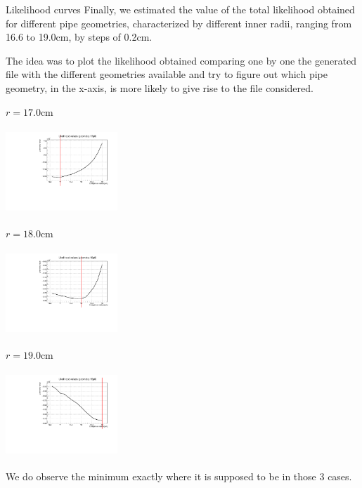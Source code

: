 \documentclass[8 pt]{beamer}
\begin{document}
\begin{frame}{Likelihood curves}
\justifying
Finally, we estimated the value of the total likelihood obtained for different pipe geometries, characterized by different inner radii, ranging from 16.6 to 19.0cm, by steps of 0.2cm. \vfill

The idea was to plot the likelihood obtained comparing one by one the generated file with the different geometries available and try to figure out which pipe geometry, in the x-axis, is more likely to give rise to the file considered. \vfill

\begin{minipage}[c]{.32\textwidth}
\begin{exampleblock}{} \begin{center}$r = 17.0$cm\end{center} \end{exampleblock}
\includegraphics[width=4.2cm, height=3.2cm]{figs/likelihood100HighStat/likelihood17p0.pdf} 
\end{minipage}
\begin{minipage}[c]{.32\textwidth}
\begin{exampleblock}{} \begin{center}$r = 18.0$cm\end{center} \end{exampleblock}
\includegraphics[width=4.2cm, height=3.2cm]{figs/likelihood100HighStat/likelihood18p0.pdf} 
\end{minipage}
\begin{minipage}[c]{.32\textwidth}
\begin{exampleblock}{} \begin{center}$r = 19.0$cm\end{center} \end{exampleblock}
\includegraphics[width=4.2cm, height=3.2cm]{figs/likelihood100HighStat/likelihood19p0.pdf} 
\end{minipage} \vfill

We do observe the minimum exactly where it is supposed to be in those 3 cases. \vfill
\end{frame}
\end{document}
